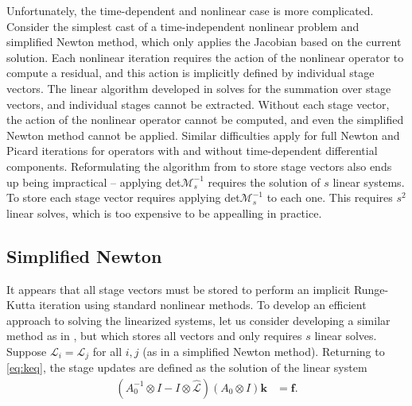 \documentclass[review]{siamart}
\begin{document}
Unfortunately, the time-dependent and nonlinear case is more complicated. Consider
the simplest cast of a time-independent nonlinear problem and simplified Newton method,
which only applies the Jacobian based on the current solution. Each
nonlinear iteration requires the action of the nonlinear operator to compute a residual,
and this action is implicitly defined by individual stage vectors. The linear algorithm
developed in  solves for the summation over stage vectors, and individual
stages cannot be extracted. Without each stage vector, the action of the nonlinear 
operator cannot be computed, and even the simplified Newton method cannot be applied.
Similar difficulties apply for full Newton and Picard iterations for operators with
and without time-dependent differential components. Reformulating the algorithm
from  to store stage vectors also ends up being impractical --
applying det$\mathcal{M}_s^{-1}$ requires the solution of $s$ linear systems. To store
each stage vector requires applying det$\mathcal{M}_s^{-1}$ to each one. This
requires $s^2$ linear solves, which is too expensive to be appealling in practice. 

\subsection{Simplified Newton}\label{sec:nonlinear:simp}

It appears that all stage vectors must be stored to perform an implicit
Runge-Kutta iteration using standard nonlinear methods. To develop an efficient
approach to solving the linearized systems, let us consider developing a similar
method as in , but which stores all vectors and only requires $s$
linear solves. Suppose $\mathcal{L}_i = \mathcal{L}_j$ for all $i,j$ (as in a
simplified Newton method). Returning to \eqref{eq:keq}, the stage updates are
defined as the solution of the linear system
%
\begin{align}\label{eq:keq2}
\left( A_0^{-1}\otimes I - I\otimes\widehat{\mathcal{L}}\right)
	(A_0\otimes I) \mathbf{k} & = \mathbf{f}.
\end{align}
%
\end{document}
